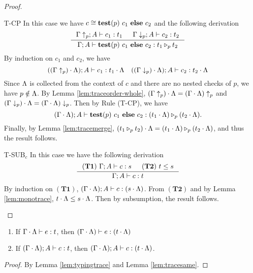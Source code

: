 {{{\begin{proof}
\begin{ProofEnumDesc}
\item[T-CP] In this case we have $c\cong \lcCP{p}{c_1}{c_2}$ and the following derivation
\begin{equation*}
\inference
{\Gamma\uparrow_{p};  A \vdash c_1 : t_1 &
\Gamma\downarrow_{p}; A \vdash c_2 : t_2}
{\Gamma; A \vdash \lcCP{p}{c_1}{c_2} : \omerge{p}{t_1}{t_2}}
\end{equation*}
By induction on $c_1$ and $c_2$, we have
\begin{equation*}
((\Gamma\uparrow_{p})\cdot \trace); A \vdash c_1 : t_1\cdot\trace
\quad
((\Gamma\downarrow_{p})\cdot \trace); A \vdash c_2 : t_2\cdot\trace
\end{equation*}
Since $\trace$ is collected from the context of $c$ and there are no nested checks of $p$, we have $p \notin \trace$.
By Lemma \ref{lem:traceorder-whole},
$(\Gamma\uparrow_{p})\cdot \trace= (\Gamma\cdot \trace)\uparrow_{p}$
and $(\Gamma\downarrow_{p})\cdot \trace= (\Gamma\cdot \trace)\downarrow_{p}$.
Then by Rule {(T-CP)}, we have
$$
(\Gamma\cdot \trace); A \vdash \lcCP{p}{c_1}{c_2} : \omerge{p}{(t_1\cdot \trace)}{(t_2\cdot \trace)}.
$$
Finally, by Lemma \ref{lem:tracemerge}, $(\omerge{p}{t_1}{t_2})\cdot \trace = \omerge{p}{(t_1\cdot \trace)}{(t_2\cdot \trace)} $, and thus the result follows.

\item[T-SUB$_c$] %
In this case we have the following derivation
\begin{equation*}
\inference
{(\mathbf{T1})~\Gamma;A \vdash c : s & (\mathbf{T2})~t \leq s}
{\Gamma;A  \vdash c : t}
\end{equation*}
By induction on $(\mathbf{T1})$,  $(\Gamma\cdot\trace);A \vdash c : (s\cdot\trace)$.
From $(\mathbf{T2})$ and by Lemma \ref{lem:monotrace}, $t\cdot\trace\leq  s\cdot\trace$.
Then by subsumption, the result follows.
\end{ProofEnumDesc}
\end{proof}



\begin{lemma}\label{lem:typingtrace1}
\begin{enumerate}[label=(\alph*),topsep=1pt,itemsep=-1ex,partopsep=1ex,parsep=1ex]
\item\label{lem:typingtrace1-1} If $\Gamma\cdot\trace \vdash e : t$, then $(\Gamma\cdot\trace) \vdash e : (t\cdot\trace) $
\item\label{lem:typingtrace1-2} If $(\Gamma\cdot\trace);A \vdash c : t$, then $(\Gamma\cdot\trace); A \vdash c : (t\cdot\trace) $.
\end{enumerate}
\end{lemma}
\begin{proof}
By Lemma \ref{lem:typingtrace} and Lemma \ref{lem:tracesame}.
\end{proof}

}}}
